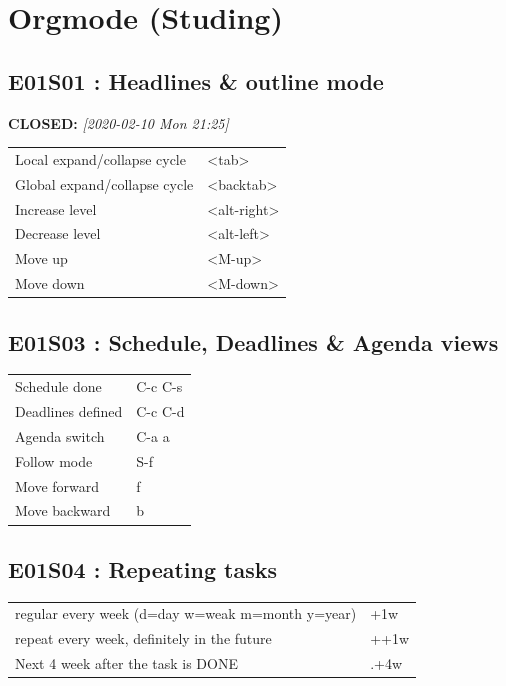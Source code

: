 \documentclass[11pt]{article}
\begin{document}
\section{Orgmode (Studing)}
\label{sec:orga80c043}
\subsection{E01S01 : Headlines \& outline mode}
\label{sec:orgdc068b4}
\noindent\textbf{CLOSED:} \textit{[2020-02-10 Mon 21:25]}\\
\begin{center}
\begin{tabular}{ll}
Local expand/collapse cycle &  <tab> \\
Global expand/collapse cycle &  <backtab> \\
Increase level &  <alt-right> \\
Decrease level &  <alt-left> \\
Move up &  <M-up> \\
Move down &  <M-down> \\
\end{tabular}
\end{center}

\subsection{E01S03 : Schedule, Deadlines \& Agenda views}
\label{sec:org2ca0d63}
\begin{center}
\begin{tabular}{ll}
Schedule done &  C-c C-s \\
Deadlines defined &  C-c C-d \\
Agenda switch &  C-a a \\
Follow mode &  S-f \\
Move forward &  f \\
Move backward &  b \\
\end{tabular}
\end{center}
\subsection{E01S04 : Repeating tasks}
\label{sec:org189e51d}
\begin{center}
\begin{tabular}{ll}
regular every week (d=day w=weak m=month y=year) & +1w\\
repeat every week, definitely in the future & ++1w\\
Next 4 week after the task is DONE & .+4w\\
\end{tabular}
\end{center}
\end{document}
